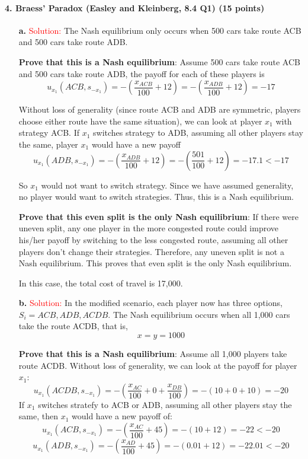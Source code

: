 \documentclass[11pt]{article} %
\begin{document}
\paragraph{4. Braess' Paradox  (Easley and Kleinberg, 8.4 Q1) (15 points)}

\begin{itemize}
\item[\textbf{a. }]
\textcolor{red}{Solution:}
The Nash equilibrium only occurs when 500 cars take route ACB and 500 cars take route ADB.

\textbf{Prove that this is a Nash equilibrium}: Assume 500 cars take route ACB and 500 cars take route ADB, the payoff for each of these players is
$$u_{x_1}(ACB, s_{-x_1})=-(\frac{x_{ACB}}{100}+12)=-(\frac{x_{ADB}}{100}+12) = -17$$

Without loss of generality (since route ACB and ADB are symmetric, players choose either route have the same situation), we can look at player $x_1$ with strategy ACB. If $x_1$ switches strategy to ADB, assuming all other players stay the same, player $x_1$ would have a new payoff
$$ u_{x_1}(ADB, s_{-x_1})=-(\frac{x_{ADB}}{100}+12) =-(\frac{501}{100}+12) = -17.1 < -17$$

So $x_1$ would not want to switch strategy. Since we have assumed generality, no player would want to switch strategies. Thus, this is a Nash equilibrium.

\textbf{Prove that this even split is the only Nash equilibrium}: If there were uneven split, any one player in the more congested route could improve his/her payoff by switching to the less congested route, assuming all other players don't change their strategies. Therefore, any uneven split is not a Nash equilibrium. This proves that even split is the only Nash equilibrium.

In this case, the total cost of travel is 17,000.

\item[\textbf{b. }]
\textcolor{red}{Solution:}
In the modified scenario, each player now has three options, $S_i={ACB, ADB, ACDB}$. The Nash equilibrium occurs when all 1,000 cars take the route ACDB, that is, $$x=y=1000$$

\textbf{Prove that this is a Nash equilibrium}: Assume all 1,000 players take route ACDB. Without loss of generality, we can look at the payoff for player $x_1$:
$$u_{x_1}(ACDB, s_{-x_1})= -(\frac{x_{AC}}{100}+0+\frac{x_{DB}}{100})=-(10+0+10) = -20$$
If $x_1$ switches stratefy to ACB or ADB, assuming all other players stay the same, then $x_1$ would have a new payoff of:
$$u_{x_1}(ACB, s_{-x_1})= -(\frac{x_{AC}}{100}+45)=-(10+12) = -22 <-20$$
$$u_{x_1}(ADB, s_{-x_1})= -(\frac{x_{AD}}{100}+45)=-(0.01+12) = -22.01 <-20$$


\end{itemize}
\end{document}
